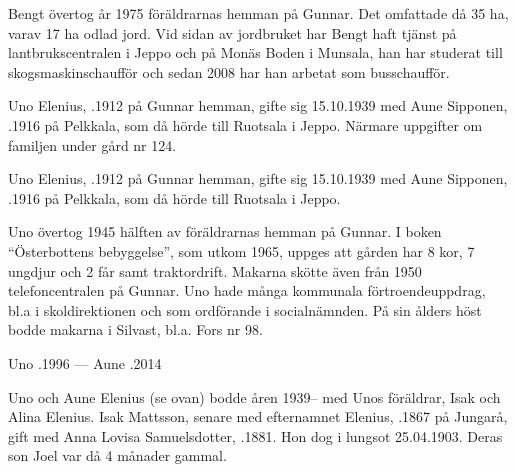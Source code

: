 Bengt övertog år 1975 föräldrarnas hemman på Gunnar. Det omfattade då 35 ha, varav 17 ha odlad jord. Vid sidan av jordbruket har Bengt haft tjänst på lantbrukscentralen i Jeppo och på Monäs Boden i Munsala, han har studerat till skogsmaskinschaufför och sedan 2008 har han arbetat som busschaufför.


%
Uno Elenius, .1912 på Gunnar hemman, gifte sig 15.10.1939 med Aune Sipponen, .1916 på Pelkkala, som då hörde till Ruotsala i Jeppo. Närmare uppgifter om familjen under gård nr 124.


%


%
Uno Elenius, .1912 på Gunnar hemman, gifte sig 15.10.1939 med Aune Sipponen, .1916 på Pelkkala, som då hörde till Ruotsala i Jeppo.
\begin{jhchildren}
  \item {}
  \item {}
  \item {}
  \item {}
\end{jhchildren}

Uno övertog 1945 hälften av föräldrarnas hemman på Gunnar. I boken ``Österbottens bebyggelse'', som utkom 1965, uppges att gården har 8 kor, 7 ungdjur och 2 får samt traktordrift. Makarna skötte även från 1950 telefoncentralen på Gunnar. Uno hade många kommunala förtroendeuppdrag, bl.a i skoldirektionen och som ordförande i socialnämnden. På sin ålders höst bodde makarna i Silvast, bl.a. Fors nr 98.

Uno .1996  ---  Aune .2014



%
Uno och Aune Elenius (se ovan) bodde åren 1939-- med Unos föräldrar, Isak och Alina Elenius. Isak Mattsson, senare med efternamnet Elenius, .1867 på Jungarå, gift med Anna Lovisa Samuelsdotter, .1881. Hon dog i lungsot 25.04.1903. Deras son Joel var då 4 månader gammal.

